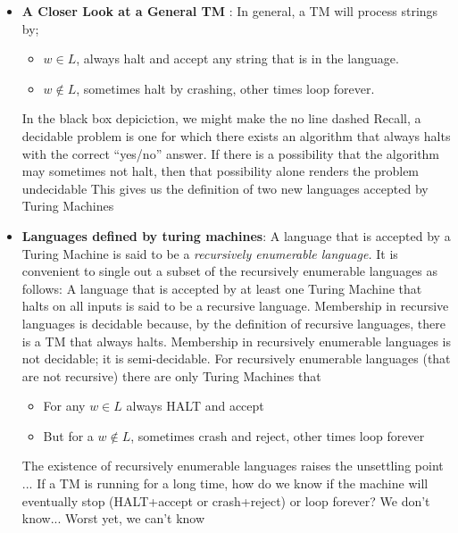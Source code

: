 \documentclass{report}
\begin{document}
\begin{itemize}
        \item \textbf{A Closer Look at a General TM }: In general, a TM will process strings by;
            \begin{itemize}
                \item $w \in L$, always halt and accept any string that is in the language.
                \item $w \not\in L$, sometimes halt by crashing, other times loop forever. 
            \end{itemize}
            \bigbreak \noindent 
            In the black box depiciction, we might make the no line dashed
            \bigbreak \noindent 
            Recall, a decidable problem is one for which there exists an algorithm that always halts with the correct “yes/no” answer.
            \bigbreak \noindent 
            If there is a possibility that the algorithm may sometimes not halt, then that possibility alone renders the problem undecidable
            \bigbreak \noindent 
            This gives us the definition of two new languages accepted by Turing Machines
        \item \textbf{Languages defined by turing machines}: A language that is accepted by a Turing Machine is said to be a \textit{recursively enumerable language.}
            \bigbreak \noindent 
            It is convenient to single out a subset of the recursively enumerable languages as follows:
            \bigbreak \noindent 
            A language that is accepted by at least one Turing Machine that halts on all inputs is said to be a recursive language.
            \bigbreak \noindent 
            Membership in recursive languages is decidable because, by the definition of recursive languages, there is a TM that always halts.
            \bigbreak \noindent 
            Membership in recursively enumerable languages is not decidable; it is semi-decidable. For recursively enumerable languages (that are not recursive) there are only Turing Machines that
            \begin{itemize}
                \item For any $w \in L$ always HALT and accept
                \item But for a $w \not\in L$, sometimes crash and reject, other times loop forever
            \end{itemize}
            \bigbreak \noindent 
            The existence of recursively enumerable languages raises the unsettling point ...
            \bigbreak \noindent 
            If a TM is running for a long time, how do we know if the machine will eventually stop (HALT+accept or crash+reject) or loop forever?
            \bigbreak \noindent 
            We don’t know... Worst yet, we can’t know
            \bigbreak \noindent 

    \end{itemize}
\end{document}

